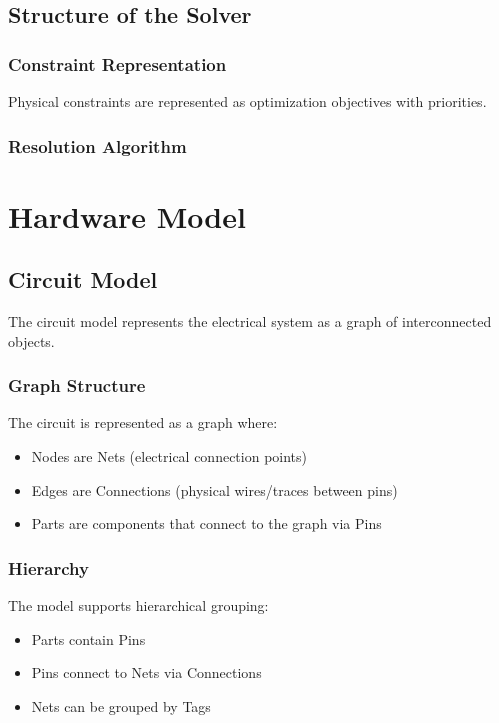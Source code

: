 \documentclass{report}
\begin{document}
\chapter{Structure of the Solver}

\section{Constraint Representation}
Physical constraints are represented as optimization objectives with priorities.

\section{Resolution Algorithm}




\part{Hardware Model}
\chapter{Circuit Model}
The circuit model represents the electrical system as a graph of interconnected objects.

\section{Graph Structure}
The circuit is represented as a graph where:
\begin{itemize}
\item Nodes are Nets (electrical connection points)
\item Edges are Connections (physical wires/traces between pins)
\item Parts are components that connect to the graph via Pins
\end{itemize}

\section{Hierarchy}
The model supports hierarchical grouping:
\begin{itemize}
\item Parts contain Pins
\item Pins connect to Nets via Connections
\item Nets can be grouped by Tags
\end{itemize}
\end{document}
